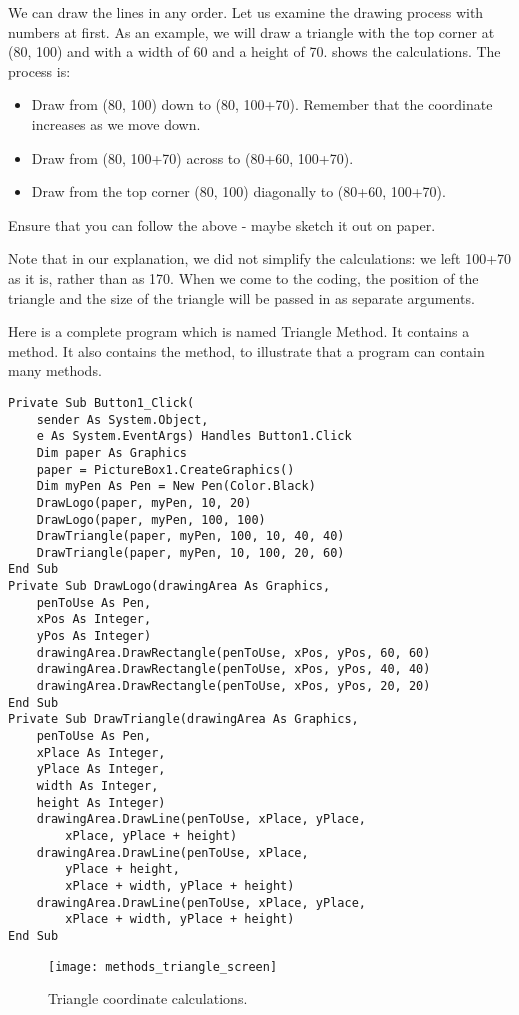 		We can draw the lines in any order. Let us examine the drawing process with numbers at first. As an example, we will draw a triangle with the top corner at (80, 100) and with a width of 60 and a height of 70.  shows the calculations. The process is:
		\begin{itemize}
			\item Draw from (80, 100) down to (80, 100+70). Remember that the  coordinate increases as we move down.
			\item Draw from (80, 100+70) across to (80+60, 100+70).
			\item Draw from the top corner (80, 100) diagonally to (80+60, 100+70).
		\end{itemize}
		Ensure that you can follow the above - maybe sketch it out on paper.
		
		Note that in our explanation, we did not simplify the calculations: we left 100+70 as it is, rather than as 170. When we come to the coding, the position of the triangle and the size of the triangle will be passed in as separate arguments.

		Here is a complete program which is named Triangle Method. It contains a  method. It also contains the  method, to illustrate that a program can contain many methods.
		\begin{lstlisting}
Private Sub Button1_Click(
	sender As System.Object,
	e As System.EventArgs) Handles Button1.Click
	Dim paper As Graphics
	paper = PictureBox1.CreateGraphics()
	Dim myPen As Pen = New Pen(Color.Black)
	DrawLogo(paper, myPen, 10, 20)
	DrawLogo(paper, myPen, 100, 100)
	DrawTriangle(paper, myPen, 100, 10, 40, 40)
	DrawTriangle(paper, myPen, 10, 100, 20, 60)
End Sub
Private Sub DrawLogo(drawingArea As Graphics,
	penToUse As Pen,
	xPos As Integer,
	yPos As Integer)
	drawingArea.DrawRectangle(penToUse, xPos, yPos, 60, 60)
	drawingArea.DrawRectangle(penToUse, xPos, yPos, 40, 40)
	drawingArea.DrawRectangle(penToUse, xPos, yPos, 20, 20)
End Sub
Private Sub DrawTriangle(drawingArea As Graphics,
	penToUse As Pen,
	xPlace As Integer,
	yPlace As Integer,
	width As Integer, 
	height As Integer)
	drawingArea.DrawLine(penToUse, xPlace, yPlace,
		xPlace, yPlace + height)
	drawingArea.DrawLine(penToUse, xPlace,
		yPlace + height,
		xPlace + width, yPlace + height)
	drawingArea.DrawLine(penToUse, xPlace, yPlace,
		xPlace + width, yPlace + height)
End Sub
		\end{lstlisting}

		\begin{figure}[ht]
			\centering
			\texttt{[image: methods\_triangle\_screen]}
			\caption{Triangle coordinate calculations.}
			\label{fig:methods_triangle_screen}
		\end{figure}

